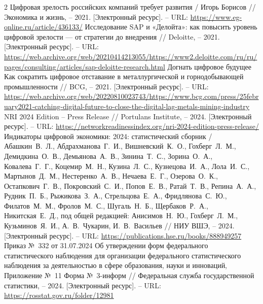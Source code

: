 \documentclass{article}
\begin{document}
\newpage
\begin{thebibliography}{2}
 Цифровая зрелость российских компаний требует развития / Игорь Борисов // Экономика и жизнь, – 2021. [Электронный ресурс]. – URL: \url{https://www.eg-online.ru/article/436133/}
 Исследование SAP и «Делойта»: как повысить уровень цифровой зрелости — от стратегии до внедрения // Deloitte, – 2021. [Электронный ресурс]. – URL: \url{https://web.archive.org/web/20210414213055/https://www2.deloitte.com/ru/ru/pages/consulting/articles/sap-deloitte-research.html}
 Догнать цифровое будущее Как сократить цифровое отставание в металлургической и горнодобывающей промышленности // BCG, – 2021. [Электронный ресурс]. – URL: \url{https://web.archive.org/web/20220810023743/https://www.bcg.com/press/25february2021-catching-digital-future-to-close-the-digital-lag-metals-mining-industry}
 NRI 2024 Edition – Press Release // Portulans Institute, – 2024. [Электронный ресурс]. – URL: \url{https://networkreadinessindex.org/nri-2024-edition-press-release/}
 Индикаторы цифровой экономики: 2024: статистический сборник / Абашкин~В.~Л., Абдрахманова~Г.~И., Вишневский~К.~О., Гохберг~Л.~М., Демидкина~О.~В., Демьянова~А.~В., Зинина~Т.~С., Зорина~О.~А., Ковалева~Г.~Г., Коцемир~М.~Н., Кузина~Л.~С., Кузнецова~И.~А., Лола~И.~С., Мартынов~Д.~М., Нестеренко~А.~В., Нечаева~Е.~Г., Озерова~О.~К., Остапкович~Г.~В., Покровский~С.~И., Попов~Е.~В., Ратай~Т.~В., Репина~А.~А., Рудник~П.~Б., Рыжикова~З.~А., Стрельцова~Е.~А., Фридлянова~С.~Ю., Филатов~М.~М., Фролов~М.~С., Шугаль~Н.~Б., Щербаков~Р.~А., Никитская~Е.~Д., под общей редакцией: Анисимов~Н.~Ю., Гохберг~Л.~М., Кузьминов~Я.~И., А.~В.~Чукарин, И.~В.~Васильев // НИУ ВШЭ, – 2024. [Электронный ресурс]. – URL: \url{https://publications.hse.ru/books/888949257}
 Приказ №~332 от 31.07.2024 Об утверждении форм федерального статистического наблюдения для организации федерального статистического наблюдения за деятельностью в сфере образования, науки и инноваций, Приложение №~11 Форма №~3-информ // Федеральная служба государственной статистики, – 2024. [Электронный ресурс]. – URL: \url{https://rosstat.gov.ru/folder/12981}

\end{thebibliography}
\end{document}
